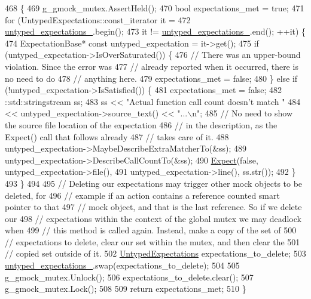 \begin{DoxyCode}
468                                                   \{
469   g\_gmock\_mutex.AssertHeld();
470   \textcolor{keywordtype}{bool} expectations\_met = \textcolor{keyword}{true};
471   \textcolor{keywordflow}{for} (UntypedExpectations::const\_iterator it =
472            \hyperlink{classtesting_1_1internal_1_1UntypedFunctionMockerBase_aae4a42a4bace1fcb0cd4bdf1ddd40277}{untyped\_expectations\_}.begin();
473        it != \hyperlink{classtesting_1_1internal_1_1UntypedFunctionMockerBase_aae4a42a4bace1fcb0cd4bdf1ddd40277}{untyped\_expectations\_}.end(); ++it) \{
474     ExpectationBase* \textcolor{keyword}{const} untyped\_expectation = it->get();
475     \textcolor{keywordflow}{if} (untyped\_expectation->IsOverSaturated()) \{
476       \textcolor{comment}{// There was an upper-bound violation.  Since the error was}
477       \textcolor{comment}{// already reported when it occurred, there is no need to do}
478       \textcolor{comment}{// anything here.}
479       expectations\_met = \textcolor{keyword}{false};
480     \} \textcolor{keywordflow}{else} \textcolor{keywordflow}{if} (!untyped\_expectation->IsSatisfied()) \{
481       expectations\_met = \textcolor{keyword}{false};
482       ::std::stringstream ss;
483       ss  << \textcolor{stringliteral}{"Actual function call count doesn't match "}
484           << untyped\_expectation->source\_text() << \textcolor{stringliteral}{"...\(\backslash\)n"};
485       \textcolor{comment}{// No need to show the source file location of the expectation}
486       \textcolor{comment}{// in the description, as the Expect() call that follows already}
487       \textcolor{comment}{// takes care of it.}
488       untyped\_expectation->MaybeDescribeExtraMatcherTo(&ss);
489       untyped\_expectation->DescribeCallCountTo(&ss);
490       \hyperlink{namespacetesting_1_1internal_ab3000fc56be000e4fa6ed7cdcfee3106}{Expect}(\textcolor{keyword}{false}, untyped\_expectation->file(),
491              untyped\_expectation->line(), ss.str());
492     \}
493   \}
494 
495   \textcolor{comment}{// Deleting our expectations may trigger other mock objects to be deleted, for}
496   \textcolor{comment}{// example if an action contains a reference counted smart pointer to that}
497   \textcolor{comment}{// mock object, and that is the last reference. So if we delete our}
498   \textcolor{comment}{// expectations within the context of the global mutex we may deadlock when}
499   \textcolor{comment}{// this method is called again. Instead, make a copy of the set of}
500   \textcolor{comment}{// expectations to delete, clear our set within the mutex, and then clear the}
501   \textcolor{comment}{// copied set outside of it.}
502   \hyperlink{classtesting_1_1internal_1_1UntypedFunctionMockerBase_a36480bd395e110b4eae5b0d0402de966}{UntypedExpectations} expectations\_to\_delete;
503   \hyperlink{classtesting_1_1internal_1_1UntypedFunctionMockerBase_aae4a42a4bace1fcb0cd4bdf1ddd40277}{untyped\_expectations\_}.swap(expectations\_to\_delete);
504 
505   g\_gmock\_mutex.Unlock();
506   expectations\_to\_delete.clear();
507   g\_gmock\_mutex.Lock();
508 
509   \textcolor{keywordflow}{return} expectations\_met;
510 \}
\end{DoxyCode}


